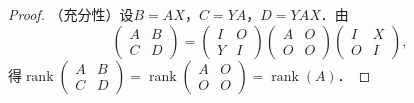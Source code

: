 \documentclass[a4paper,fontset=windows]{ctexbook}
\theoremstyle{definition}
\DeclareMathOperator{\rank}{rank}
\begin{document}
\begin{proof}
（充分性）设$B=AX$，$C=YA$，$D=YAX$．由
$$\begin{pmatrix}A&B \\ C&D\end{pmatrix}=\begin{pmatrix}I&O \\ Y&I\end{pmatrix}\begin{pmatrix}A&O \\ O&O\end{pmatrix}\begin{pmatrix}I&X \\ O&I\end{pmatrix},$$
得$\rank\begin{pmatrix}A&B \\ C&D\end{pmatrix}=\rank\begin{pmatrix}A&O \\ O&O\end{pmatrix}=\rank(A)$．


\end{proof}
\end{document}
